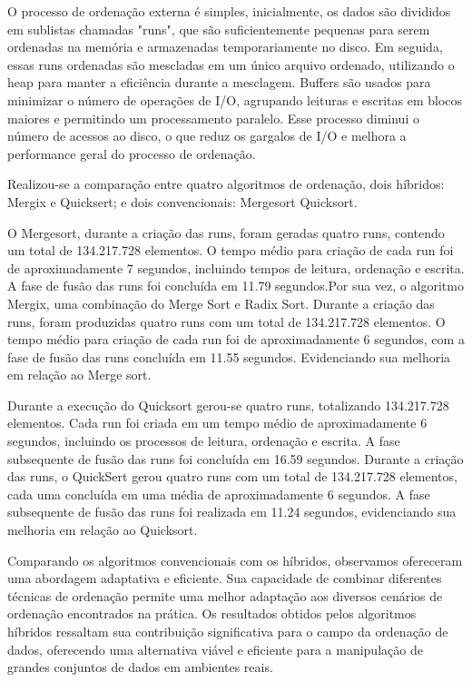 \documentclass[12pt]{article}
\begin{document}
O processo de ordenação externa é simples, inicialmente, os dados são divididos em sublistas chamadas "runs", que são suficientemente pequenas para serem ordenadas na memória e armazenadas temporariamente no disco. Em seguida, essas runs ordenadas são mescladas em um único arquivo ordenado, utilizando o heap para manter a eficiência durante a mesclagem. Buffers são usados para minimizar o número de operações de I/O, agrupando leituras e escritas em blocos maiores e permitindo um processamento paralelo. Esse processo diminui o número de acessos ao disco, o que reduz os gargalos de I/O e melhora a performance geral do processo de ordenação.

Realizou-se a comparação entre quatro algoritmos de ordenação, dois híbridos: Mergix e Quicksert; e dois convencionais: Mergesort Quicksort.

O Mergesort, durante a criação das runs, foram geradas quatro runs, contendo um total de 134.217.728 elementos. O tempo médio para criação de cada run foi de aproximadamente 7 segundos, incluindo tempos de leitura, ordenação e escrita. A fase de fusão das runs foi concluída em 11.79 segundos.Por sua vez, o algoritmo Mergix, uma combinação do Merge Sort e Radix Sort. Durante a criação das runs, foram produzidas quatro runs com um total de 134.217.728 elementos. O tempo médio para criação de cada run foi de aproximadamente 6 segundos, com a fase de fusão das runs concluída em 11.55 segundos. Evidenciando sua melhoria em relação ao Merge sort.

Durante a execução do Quicksort gerou-se quatro runs, totalizando 134.217.728 elementos. Cada run foi criada em um tempo médio de aproximadamente 6 segundos, incluindo os processos de leitura, ordenação e escrita. A fase subsequente de fusão das runs foi concluída em 16.59 segundos. Durante a criação das runs, o QuickSert gerou quatro runs com um total de 134.217.728 elementos, cada uma concluída em uma média de aproximadamente 6 segundos. A fase subsequente de fusão das runs foi realizada em 11.24 segundos, evidenciando sua melhoria em relação ao Quicksort.

Comparando os algoritmos convencionais com os híbridos, observamos ofereceram uma abordagem adaptativa e eficiente. Sua capacidade de combinar diferentes técnicas de ordenação permite uma melhor adaptação aos diversos cenários de ordenação encontrados na prática. Os resultados obtidos pelos algoritmos híbridos ressaltam sua contribuição significativa para o campo da ordenação de dados, oferecendo uma alternativa viável e eficiente para a manipulação de grandes conjuntos de dados em ambientes reais.
\end{document}
